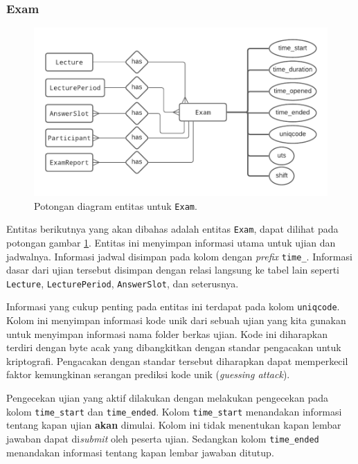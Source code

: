 \subsubsection{Exam}
    \begin{figure}
        \centering
        \includegraphics[width=0.75\paperwidth]{Gambar/erd-details/ERD--New - Exam.pdf}
        \caption{Potongan diagram entitas untuk \texttt{Exam}.}
        \label{fig:erd_exam}
    \end{figure}
    Entitas berikutnya yang akan dibahas adalah entitas \texttt{Exam}, dapat
    dilihat pada potongan gambar \ref{fig:erd_exam}. Entitas ini menyimpan
    informasi utama untuk ujian dan jadwalnya. Informasi jadwal disimpan pada
    kolom dengan \textit{prefix} \texttt{time\_}. Informasi dasar dari ujian
    tersebut disimpan dengan relasi langsung ke tabel lain seperti
    \texttt{Lecture}, \texttt{LecturePeriod}, \texttt{AnswerSlot}, dan
    seterusnya. 
    
    Informasi yang cukup penting pada entitas ini terdapat pada kolom
    \texttt{uniqcode}. Kolom ini menyimpan informasi kode unik dari sebuah ujian
    yang kita gunakan untuk menyimpan informasi nama folder berkas ujian. Kode
    ini diharapkan terdiri dengan byte acak yang dibangkitkan dengan standar
    pengacakan untuk kriptografi. Pengacakan dengan standar tersebut diharapkan
    dapat memperkecil faktor kemungkinan serangan prediksi kode unik
    (\textit{guessing attack}).
    
    Pengecekan ujian yang aktif dilakukan dengan melakukan pengecekan pada kolom
    \texttt{time\_start} dan \texttt{time\_ended}. Kolom \texttt{time\_start}
    menandakan informasi tentang kapan ujian \textbf{akan} dimulai. Kolom ini
    tidak menentukan kapan lembar jawaban dapat di\textit{submit} oleh peserta
    ujian. Sedangkan kolom \texttt{time\_ended} menandakan informasi tentang
    kapan lembar jawaban ditutup.
    
